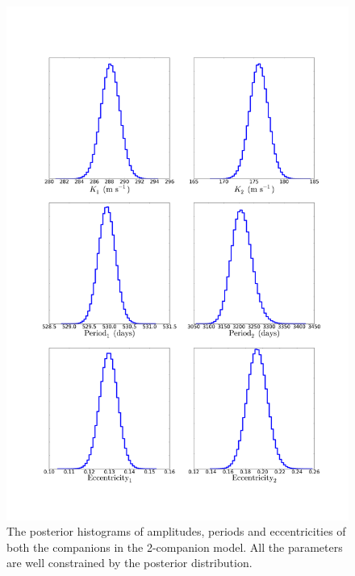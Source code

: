 \documentclass[letterpaper, preprint]{aastex}
\begin{document}
\begin{figure}
 \centering
 \includegraphics[width=0.80\linewidth]{282-2-hist.png}
 \caption{The posterior histograms of amplitudes, periods and eccentricities of both the companions in the 2-companion model. All the parameters are well constrained by the posterior distribution.}
 \label{fig:282-2-hist}
\end{figure}
\end{document}

